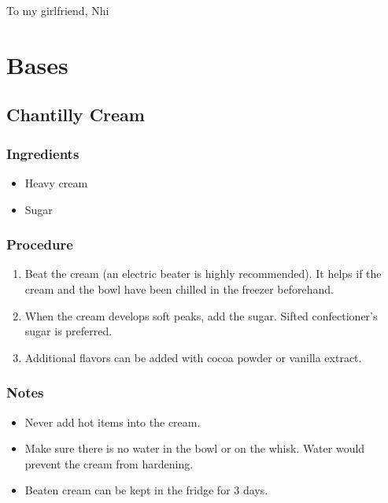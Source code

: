 \documentclass[10pt]{book}
\begin{document}
\pagestyle{plain}

To my girlfriend, Nhi

\newpage
\tableofcontents
\newpage
{}

\small


\chapter*{Bases}

\newpage
\section*{Chantilly Cream}
\subsection*{Ingredients}
	\begin{itemize}
		\item Heavy cream
		\item Sugar
	\end{itemize}
\subsection*{Procedure}
	\begin{enumerate}
		\item Beat the cream (an electric beater is highly recommended).  It helps if the cream and the bowl have been chilled in the freezer beforehand.
		\item When the cream develops soft peaks, add the sugar. Sifted confectioner's sugar is preferred.
		\item Additional flavors can be added with cocoa powder or vanilla extract.
	\end{enumerate}
\subsection*{Notes}
	\begin{itemize}
		\item Never add hot items into the cream.
		\item Make sure there is no water in the bowl or on the whisk. Water would prevent the cream from hardening.
		\item Beaten cream can be kept in the fridge for 3 days.
	\end{itemize}
	
\end{document}
